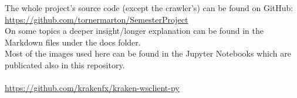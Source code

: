 \documentclass[11pt,a4paper,oneside]{article}
\begin{document}
The whole project's source code (except the crawler's) can be found on GitHub: \\ 
\url{https://github.com/tornermarton/SemesterProject} \\
On some topics a deeper insight/longer explanation can be found in the Markdown files under the docs folder. \\
Most of the images used here can be found in the Jupyter Notebooks which are publicated also in this repository. \\

\vspace{5mm}
 \\
\url{https://github.com/krakenfx/kraken-wsclient-py} 
\end{document}

